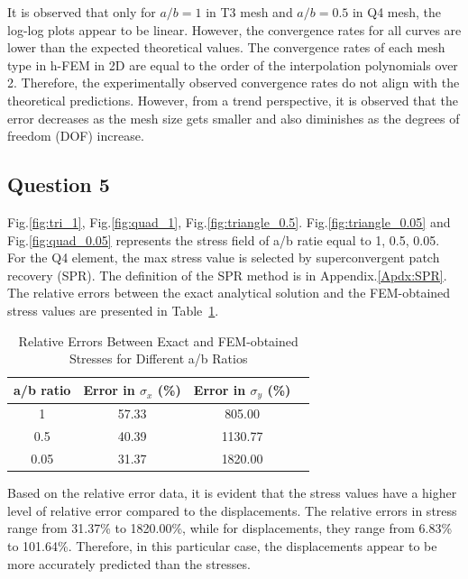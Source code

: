 \documentclass[twoside,twocolumn,10pt]{article}
\begin{document}
It is observed that only for \(a/b = 1\) in T3 mesh and \(a/b = 0.5\) in Q4 mesh, the log-log plots appear to be linear. However, the convergence rates for all curves are lower than the expected theoretical values. The convergence rates of each mesh type in h-FEM in 2D are equal to the order of the interpolation polynomials over 2. Therefore, the experimentally observed convergence rates do not align with the theoretical predictions. However, from a trend perspective, it is observed that the error decreases as the mesh size gets smaller and also diminishes as the degrees of freedom (DOF) increase.

 
\subsection{Question 5}
Fig.\ref{fig:tri_1}, Fig.\ref{fig:quad_1}, Fig.\ref{fig:triangle_0.5}. Fig.\ref{fig:triangle_0.05} and Fig.\ref{fig:quad_0.05} represents the stress field of a/b ratie equal to {1, 0.5, 0.05}. For the Q4 element, the max stress value is selected by superconvergent patch recovery (SPR). The definition of the SPR method is in Appendix.\ref{Apdx:SPR}. The relative errors between the exact analytical solution and the FEM-obtained stress values are presented in Table~\ref{tab:stress_error}.

\begin{table}[ht]
\centering
\caption{Relative Errors Between Exact and FEM-obtained Stresses for Different a/b Ratios}
\label{tab:stress_error}
\begin{tabular}{cccc}
\toprule
a/b ratio & Error in \( \sigma_{x} \) (\%) & Error in \( \sigma_{y} \) (\%) \\
\midrule
1 & 57.33 & 805.00 \\
0.5 & 40.39 & 1130.77 \\
0.05 & 31.37 & 1820.00 \\
\bottomrule
\end{tabular}
\end{table}

Based on the relative error data, it is evident that the stress values have a higher level of relative error compared to the displacements. The relative errors in stress range from 31.37\% to 1820.00\%, while for displacements, they range from 6.83\% to 101.64\%. Therefore, in this particular case, the displacements appear to be more accurately predicted than the stresses.
\end{document}
